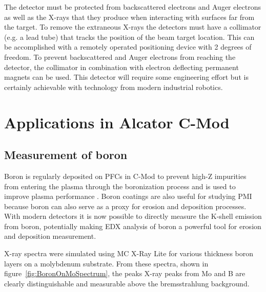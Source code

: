 \documentclass[12pt,letterpaper,final]{article}
\begin{document}
The detector must be protected from backscattered electrons and Auger electrons as well as the X-rays that they produce when interacting with surfaces far from the target.  To remove the extraneous X-rays the detectors must have a collimator (e.g. a lead tube) that tracks the position of the beam target location. This can be accomplished with a remotely operated positioning device with 2 degrees of freedom. To prevent backscattered and Auger electrons from reaching the detector, the collimator in combination with electron deflecting permanent magnets can be used. This detector will require some engineering effort but is certainly achievable with technology from modern industrial robotics.

\section{Applications in Alcator C-Mod}


\subsection{Measurement of boron}

Boron is regularly deposited on PFCs in C-Mod to prevent high-Z impurities from entering the plasma through the boronization process and is used to improve plasma performance \cite{Boronization}. Boron coatings are also useful for studying PMI because boron can also serve as a proxy for erosion and deposition processes. With modern detectors it is now possible to directly measure the K-shell emission from boron, potentially making EDX analysis of boron a powerful tool for erosion and deposition measurement.

X-ray spectra were simulated using MC X-Ray Lite \cite{MCXRayLite} for various thickness boron layers on a molybdenum substrate. From these spectra, shown in figure~\ref{fig:BoronOnMoSpectrum}, the peaks X-ray peaks from Mo and B are clearly distinguishable and measurable above the bremsstrahlung background.
\end{document}
